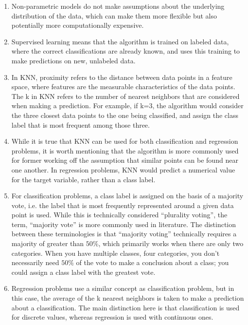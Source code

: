\documentclass[10pt,a4paper]{book}
\begin{document}
    \begin{enumerate}
    \item Non-parametric models do not make assumptions about the underlying distribution of the data, which can make them more flexible but also potentially more computationally expensive. 
    
    \item Supervised learning means that the algorithm is trained on labeled data, where the correct classifications are already known, and uses this training to make predictions on new, unlabeled data.    
    
    \item In KNN, proximity refers to the distance between data points in a feature space, where features are the measurable characteristics of the data points. The k in KNN refers to the number of nearest neighbors that are considered when making a prediction. For example, if k=3, the algorithm would consider the three closest data points to the one being classified, and assign the class label that is most frequent among those three.
    
    \item While it is true that KNN can be used for both classification and regression  problems, it is worth mentioning that the algorithm is more commonly used for former working off the assumption that similar points can be found near one another. In regression problems, KNN would predict a numerical value for the target variable, rather than a class label.
  
    \item For classification problems, a class label is assigned on the basis of a majority vote, i.e. the label that is most frequently represented around a given data point is used. While this is technically considered “plurality voting”, the term, “majority vote” is more commonly used in literature. The distinction between these terminologies is that “majority voting” technically requires a majority of greater than $50 \%$, which primarily works when there are only two categories. When you have multiple classes, four categories, you don’t necessarily need $50 \%$ of the vote to make a conclusion about a class; you could assign a class label with the greatest vote. 
    
    \item Regression problems use a similar concept as classification problem, but in this case, the average of the k nearest neighbors is taken to make a prediction about a classification. The main distinction here is that classification is used for discrete values, whereas regression is used with continuous ones. 
    

\end{enumerate}
\end{document}
